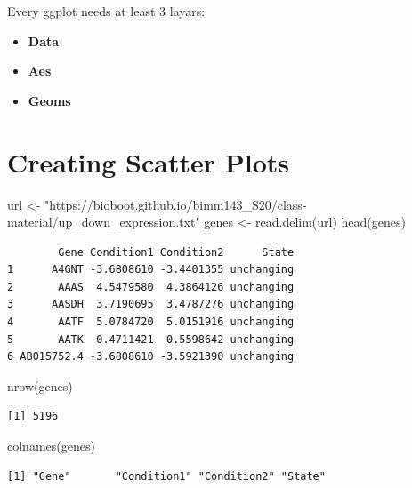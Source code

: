 \documentclass[
  letterpaper,
  DIV=11,
  numbers=noendperiod]{scrartcl}
\newenvironment{Shaded}{\begin{snugshade}}{\end{snugshade}}
\newcommand{\FunctionTok}[1]{\textcolor[rgb]{0.28,0.35,0.67}{#1}}
\newcommand{\NormalTok}[1]{\textcolor[rgb]{0.00,0.23,0.31}{#1}}
\newcommand{\OtherTok}[1]{\textcolor[rgb]{0.00,0.23,0.31}{#1}}
\newcommand{\StringTok}[1]{\textcolor[rgb]{0.13,0.47,0.30}{#1}}
\providecommand{\tightlist}{%
  \setlength{\itemsep}{0pt}\setlength{\parskip}{0pt}}\usepackage{longtable,booktabs,array}
\begin{document}
Every ggplot needs at least 3 layars:

\begin{itemize}
\tightlist
\item
  \textbf{Data}
\item
  \textbf{Aes}
\item
  \textbf{Geoms}
\end{itemize}

\hypertarget{creating-scatter-plots}{%
\section{Creating Scatter Plots}\label{creating-scatter-plots}}

\begin{Shaded}
\begin{Highlighting}[]
\NormalTok{url }\OtherTok{\textless{}{-}} \StringTok{"https://bioboot.github.io/bimm143\_S20/class{-}material/up\_down\_expression.txt"}
\NormalTok{genes }\OtherTok{\textless{}{-}} \FunctionTok{read.delim}\NormalTok{(url)}
\FunctionTok{head}\NormalTok{(genes)}
\end{Highlighting}
\end{Shaded}

\begin{verbatim}
        Gene Condition1 Condition2      State
1      A4GNT -3.6808610 -3.4401355 unchanging
2       AAAS  4.5479580  4.3864126 unchanging
3      AASDH  3.7190695  3.4787276 unchanging
4       AATF  5.0784720  5.0151916 unchanging
5       AATK  0.4711421  0.5598642 unchanging
6 AB015752.4 -3.6808610 -3.5921390 unchanging
\end{verbatim}

\begin{Shaded}
\begin{Highlighting}[]
\FunctionTok{nrow}\NormalTok{(genes)}
\end{Highlighting}
\end{Shaded}

\begin{verbatim}
[1] 5196
\end{verbatim}

\begin{Shaded}
\begin{Highlighting}[]
\FunctionTok{colnames}\NormalTok{(genes)}
\end{Highlighting}
\end{Shaded}

\begin{verbatim}
[1] "Gene"       "Condition1" "Condition2" "State"     
\end{verbatim}
\end{document}
